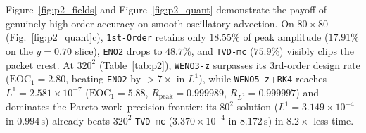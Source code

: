 \documentclass[11pt,a4paper]{article}
\newcommand{\code}[1]{\texttt{#1}}
\theoremstyle{definition}
\begin{document}
Figure~\ref{fig:p2_fields} and Figure~\ref{fig:p2_quant} demonstrate the payoff of genuinely high-order accuracy on smooth oscillatory advection. On $80\times 80$ (Fig.~\ref{fig:p2_quant}c), \code{1st-Order} retains only $18.55\%$ of peak amplitude ($17.91\%$ on the $y=0.70$ slice), \code{ENO2} drops to $48.7\%$, and \code{TVD-mc} ($75.9\%$) visibly clips the packet crest. At $320^2$ (Table~\ref{tab:p2}), \code{WENO3-z} surpasses its 3rd-order design rate ($\mathrm{EOC}_1=2.80$, beating \code{ENO2} by $>7\times$ in $L^1$), while \code{WENO5-z}+\code{RK4} reaches $L^1 = 2.581\times 10^{-7}$ ($\mathrm{EOC}_1 = 5.88$, $R_{\text{peak}}=0.999989$, $R_{L^2}=0.999997$) and dominates the Pareto work--precision frontier: its $80^2$ solution ($L^1=3.149\times 10^{-4}$ in $0.994\,\text{s}$) already beats $320^2$ \code{TVD-mc} ($3.370\times 10^{-4}$ in $8.172\,\text{s}$) in $8.2\times$ less time.
\end{document}
